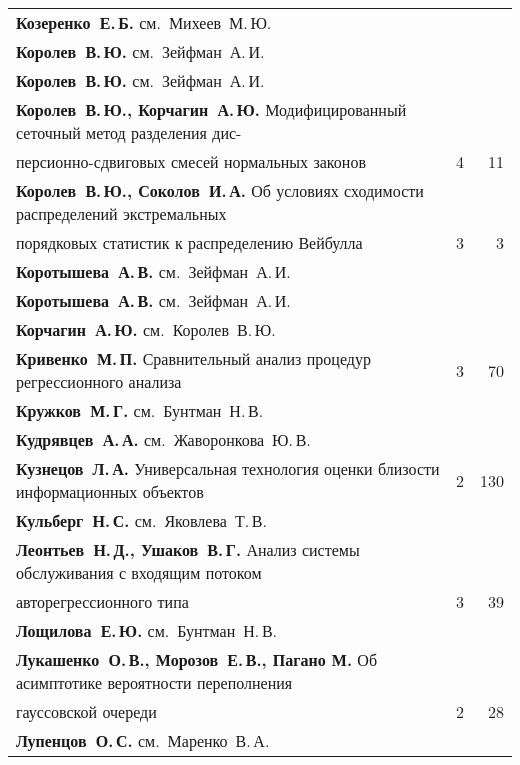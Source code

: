 {\begin{tabular}{p{388pt}rr}
\textbf{Козеренко~Е.\,Б.} см.\ Михеев~М.\,Ю.&&\\
\textbf{Королев~В.\,Ю.} см.\ Зейфман~А.\,И.&&\\
\textbf{Королев~В.\,Ю.} см.\ Зейфман~А.\,И.&&\\
\textbf{Королев~В.\,Ю., Корчагин~А.\,Ю.} Модифицированный сеточный метод
разделения дис-\linebreak
\vspace*{-12pt}\\
\hspace*{23pt}пер\-си\-он\-но-сдвиговых смесей нормальных законов\dotfill&4&11\\
\textbf{Королев~В.\,Ю., Соколов~И.\,А.} Об условиях сходимости распределений
экстремальных\linebreak
\vspace*{-12pt}\\
\hspace*{23pt}порядковых статистик к распределению Вейбулла\dotfill&3&3\\
\textbf{Коротышева~А.\,В.} см.\ Зейфман~А.\,И.&&\\
\textbf{Коротышева~А.\,В.} см.\ Зейфман~А.\,И.&&\\
\textbf{Корчагин~А.\,Ю.} см.\ Королев~В.\,Ю.&&\\
\textbf{Кривенко~М.\,П.} Сравнительный анализ процедур регрессионного
анализа\dotfill&3&70\\
\textbf{Кружков~М.\,Г.} см.\ Бунтман~Н.\,В.&&\\
\textbf{Кудрявцев~А.\,А.} см.\ Жаворонкова~Ю.\,В.&&\\
\textbf{Кузнецов~Л.\,А.} Универсальная технология оценки близости информационных
объектов %
&2&130\\
\textbf{Кульберг~Н.\,С.} см.\ Яковлева~Т.\,В.&&\\
\textbf{Леонтьев~Н.\,Д., Ушаков~В.\,Г.} Анализ системы обслуживания с входящим
потоком\linebreak
\vspace*{-12pt}\\
\hspace*{23pt}ав\-то\-ре\-грессионного типа\dotfill&3&39\\
\textbf{Лощилова~Е.\,Ю.} см.\ Бунтман~Н.\,В.&&\\
\textbf{Лукашенко~О.\,В., Морозов~Е.\,В., Пагано М.} Об асимптотике вероятности
переполнения\linebreak
\vspace*{-12pt}\\
\hspace*{23pt}гауссовской очереди\dotfill&2&28\\
\textbf{Лупенцов~О.\,С.} см.\ Маренко~В.\,А.&&\\
\end{tabular}
}

